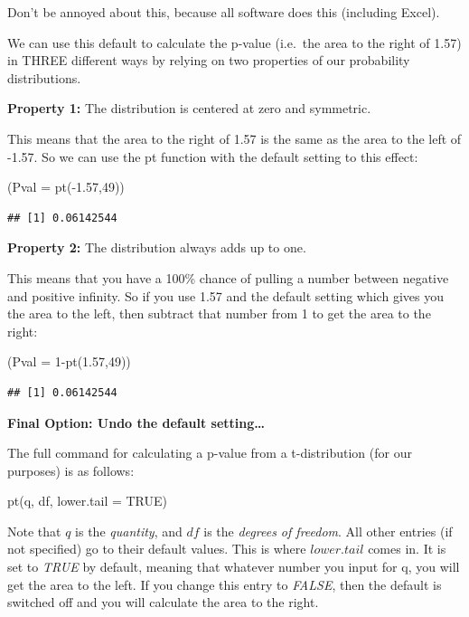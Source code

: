 \documentclass[
]{book}
\newenvironment{Shaded}{\begin{snugshade}}{\end{snugshade}}
\newcommand{\AttributeTok}[1]{\textcolor[rgb]{0.77,0.63,0.00}{#1}}
\newcommand{\DecValTok}[1]{\textcolor[rgb]{0.00,0.00,0.81}{#1}}
\newcommand{\FloatTok}[1]{\textcolor[rgb]{0.00,0.00,0.81}{#1}}
\newcommand{\FunctionTok}[1]{\textcolor[rgb]{0.00,0.00,0.00}{#1}}
\newcommand{\NormalTok}[1]{#1}
\newcommand{\SpecialCharTok}[1]{\textcolor[rgb]{0.00,0.00,0.00}{#1}}
\begin{document}
Don't be annoyed about this, because all software does this (including Excel).

We can use this default to calculate the p-value (i.e.~the area to the right of 1.57) in THREE different ways by relying on two properties of our probability distributions.

\textbf{Property 1:} The distribution is centered at zero and symmetric.

This means that the area to the right of 1.57 is the same as the area to the left of -1.57. So we can use the pt function with the default setting to this effect:

\begin{Shaded}
\begin{Highlighting}[]
\NormalTok{(}\AttributeTok{Pval =} \FunctionTok{pt}\NormalTok{(}\SpecialCharTok{{-}}\FloatTok{1.57}\NormalTok{,}\DecValTok{49}\NormalTok{))}
\end{Highlighting}
\end{Shaded}

\begin{verbatim}
## [1] 0.06142544
\end{verbatim}

\textbf{Property 2:} The distribution always adds up to one.

This means that you have a 100\% chance of pulling a number between negative and positive infinity. So if you use 1.57 and the default setting which gives you the area to the left, then subtract that number from 1 to get the area to the right:

\begin{Shaded}
\begin{Highlighting}[]
\NormalTok{(}\AttributeTok{Pval =} \DecValTok{1}\SpecialCharTok{{-}}\FunctionTok{pt}\NormalTok{(}\FloatTok{1.57}\NormalTok{,}\DecValTok{49}\NormalTok{))}
\end{Highlighting}
\end{Shaded}

\begin{verbatim}
## [1] 0.06142544
\end{verbatim}

\textbf{Final Option: Undo the default setting\ldots{}}

The full command for calculating a p-value from a t-distribution (for our purposes) is as follows:

pt(q, df, lower.tail = TRUE)

Note that \(q\) is the \emph{quantity}, and \(df\) is the \emph{degrees of freedom}. All other entries (if not specified) go to their default values. This is where \(lower.tail\) comes in. It is set to \emph{TRUE} by default, meaning that whatever number you input for q, you will get the area to the left. If you change this entry to \emph{FALSE}, then the default is switched off and you will calculate the area to the right.
\end{document}
